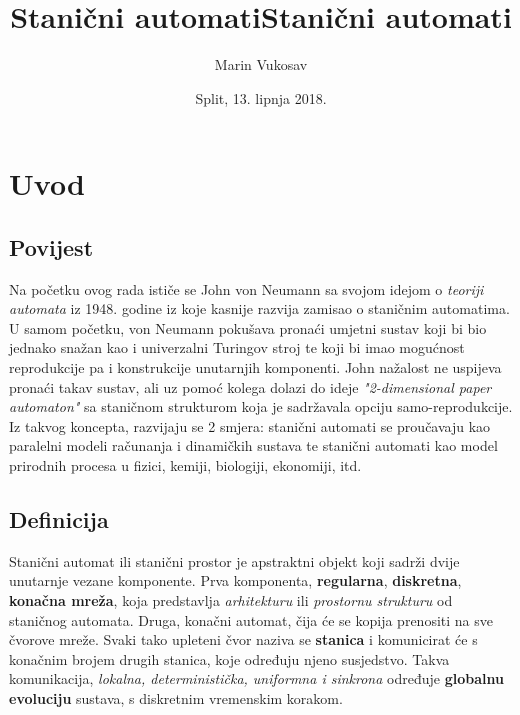 \documentclass[11pt]{article}
\title{Stanični automati}
\title{Stanični automati}
\author{Marin Vukosav}
\date{Split, 13. lipnja 2018.}
\begin{document}
    
\pagestyle{empty}
    \maketitle
\clearpage

\tableofcontents    
\clearpage
\pagestyle{plain}

\setcounter{page}{3}    

\section{Uvod}\label{uvod}

\subsection{Povijest}\label{povijest}

Na početku ovog rada ističe se John von Neumann sa svojom idejom o
\emph{teoriji automata} iz 1948. godine iz koje kasnije razvija zamisao
o staničnim automatima. U samom početku, von Neumann pokušava pronaći
umjetni sustav koji bi bio jednako snažan kao i univerzalni Turingov
stroj te koji bi imao mogućnost reprodukcije pa i konstrukcije
unutarnjih komponenti. John nažalost ne uspijeva pronaći takav sustav,
ali uz pomoć kolega dolazi do ideje \emph{"2-dimensional paper
automaton"} sa staničnom strukturom koja je sadržavala opciju
samo-reprodukcije. Iz takvog koncepta, razvijaju se 2 smjera: stanični
automati se proučavaju kao paralelni modeli računanja i dinamičkih
sustava te stanični automati kao model prirodnih procesa u fizici,
kemiji, biologiji, ekonomiji, itd.

\subsection{Definicija}\label{definicija}

Stanični automat ili stanični prostor je apstraktni objekt koji sadrži dvije
unutarnje vezane komponente. Prva komponenta, \textbf{regularna},
\textbf{diskretna}, \textbf{konačna mreža}, koja predstavlja
\emph{arhitekturu} ili \emph{prostornu strukturu} od staničnog automata.
Druga, konačni automat, čija će se kopija prenositi na sve čvorove
mreže. Svaki tako upleteni čvor naziva se \textbf{stanica} i komunicirat
će s konačnim brojem drugih stanica, koje određuju njeno susjedstvo.
Takva komunikacija, \emph{lokalna, deterministička, uniformna i
sinkrona} određuje \textbf{globalnu evoluciju} sustava, s diskretnim
vremenskim korakom.
\end{document}
